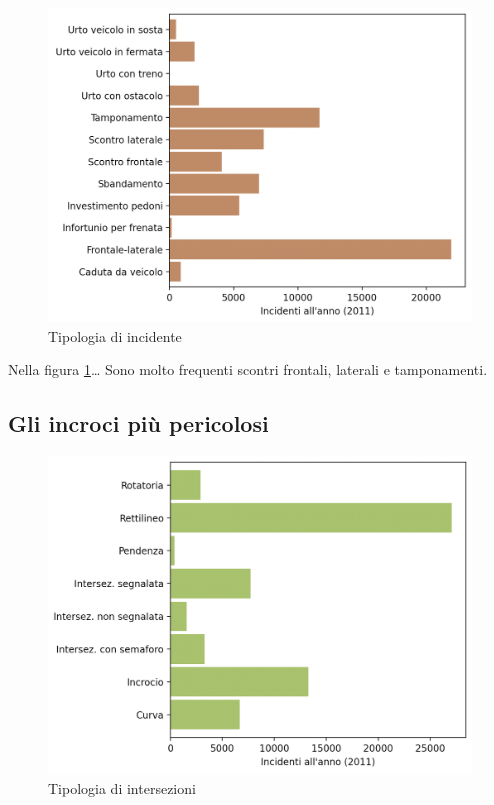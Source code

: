 \documentclass[a4paper]{report}
\begin{document}
\begin{figure}
    \includegraphics[width=\linewidth]{../src/incidenti/incidenti_senza_coords/localizzazione_incidente/tipo_incidente.png}
    \caption{Tipologia di incidente}
    \label{fig:tipo-incidente}
\end{figure}

Nella figura \ref{fig:tipo-incidente}\dots
Sono molto frequenti scontri frontali, laterali e tamponamenti.

\subsection{Gli incroci più pericolosi}

\begin{figure}
    \includegraphics[width=\linewidth]{../src/incidenti/incidenti_senza_coords/localizzazione_incidente/intersezioni.png}
    \caption{Tipologia di intersezioni}
    \label{fig:tipo-intersezioni}
\end{figure}
\end{document}
